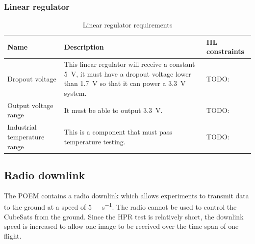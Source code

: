 \documentclass[draft]{report}
\begin{document}
\subsubsection{Linear regulator}

\begin{table}[H]
  \centering
  \begin{tabular}{|L{0.2\textwidth}|L{0.495\textwidth}|L{0.2\textwidth}|}
    \hline
    \textbf{Name}                & \textbf{Description}                                                                                                                                                  & \textbf{HL constraints} \\ \hline
    Dropout voltage              & This linear regulator will receive a constant \SI{5}{\volt}, it must have a dropout voltage lower than \SI{1.7}{\volt} so that it can power a \SI{3.3}{\volt} system. & TODO:                   \\\hline
    Output voltage range         & It must be able to output \SI{3.3}{\volt}.                                                                                                                            & TODO:                   \\\hline
    Industrial temperature range & This is a component that must pass temperature testing.                                                                                                               & TODO:                   \\\hline
  \end{tabular}
  \caption{Linear regulator requirements}
  \label{tabl:ldo-requirements}
\end{table}


\subsection{Radio downlink}

The POEM contains a radio downlink which allows experiments to transmit data to the ground at a speed of \SI{5}{\kilo\bit\per\second}. The radio cannot be used to control the CubeSats from the ground. Since the HPR test is relatively short, the downlink speed is increased to allow one image to be received over the time span of one flight.
\end{document}
